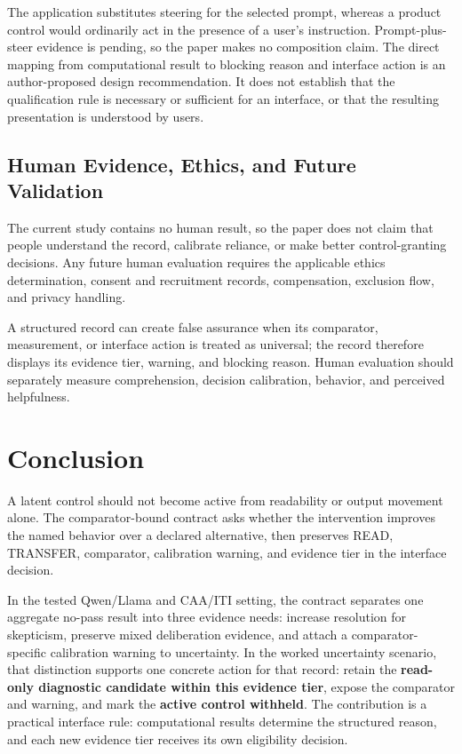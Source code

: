 \documentclass[manuscript,review,anonymous]{acmart}
\begin{document}
The application substitutes steering for the selected prompt, whereas a product control would ordinarily act in the presence of a user's instruction. {}%
Prompt-plus-steer evidence is pending, so the paper makes no composition claim. {}%
{}%
The direct mapping from computational result to blocking reason and interface action is an author-proposed design recommendation. It does not establish that the qualification rule is necessary or sufficient for an interface, or that the resulting presentation is understood by users. {}%
{}%

\subsection{Human Evidence, Ethics, and Future Validation}\label{human-evidence-ethics-and-future-validation}

The current study contains no human result, so the paper does not claim that people understand the record, calibrate reliance, or make better control-granting decisions. {}%
{}%
Any future human evaluation requires the applicable ethics determination, consent and recruitment records, compensation, exclusion flow, and privacy handling.

A structured record can create false assurance when its comparator, measurement, or interface action is treated as universal; the record therefore displays its evidence tier, warning, and blocking reason. Human evaluation should separately measure comprehension, decision calibration, behavior, and perceived helpfulness. \cite{karny2026neural,bucinca2021trust}

\section{Conclusion}\label{conclusion}

A latent control should not become active from readability or output movement alone. The comparator-bound contract asks whether the intervention improves the named behavior over a declared alternative, then preserves READ, TRANSFER, comparator, calibration warning, and evidence tier in the interface decision.

In the tested Qwen/Llama and CAA/ITI setting, the contract separates one aggregate no-pass result into three evidence needs: increase resolution for skepticism, preserve mixed deliberation evidence, and attach a comparator-specific calibration warning to uncertainty. In the worked uncertainty scenario, that distinction supports one concrete action for that record: retain the \textbf{read-only diagnostic candidate within this evidence tier}, expose the comparator and warning, and mark the \textbf{active control withheld}. The contribution is a practical interface rule: computational results determine the structured reason, and each new evidence tier receives its own eligibility decision.
\end{document}
